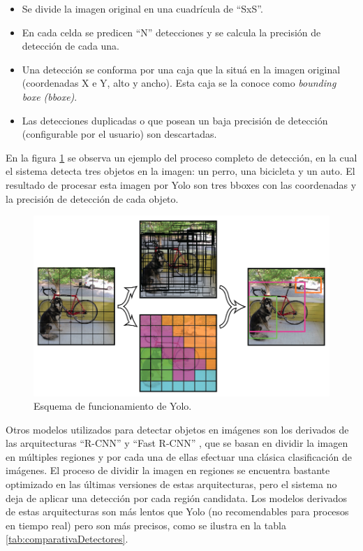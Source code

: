 \begin{itemize}
\item Se divide la imagen original en una cuadrícula de ``SxS''.
\item En cada celda se predicen ``N'' detecciones y se calcula la precisión de detección de cada una.
\item Una detección se conforma por una caja que la situá en la imagen original (coordenadas X e Y, alto y ancho). Esta caja se la conoce como \textit{bounding boxe (bboxe)}.
\item Las detecciones duplicadas o que posean un baja precisión de detección (configurable por el usuario) son descartadas.
\end{itemize}

En la figura \ref{fig:diagramaYolo} se observa un ejemplo del proceso completo de detección, en la cual el sistema detecta tres objetos en la imagen: un perro, una bicicleta y un auto. El resultado de procesar esta imagen por Yolo son tres bboxes con las coordenadas y la precisión de detección de cada objeto.

\begin{figure}[ht]
	\centering
	\includegraphics[scale=.60]{./Figures/yolo.png}
	\caption{Esquema de funcionamiento de Yolo\protect\footnotemark.}
	\label{fig:diagramaYolo}
\end{figure}


\newpage

Otros modelos utilizados para detectar objetos en imágenes son los derivados de las arquitecturas ``R-CNN'' y ``Fast R-CNN'' \citep{RCNN}, que se basan en dividir la imagen en múltiples regiones y por cada una de ellas efectuar una clásica clasificación de imágenes. El proceso de dividir la imagen en regiones se encuentra bastante optimizado en las últimas versiones de estas arquitecturas, pero el sistema no deja de aplicar una detección por cada región candidata. Los modelos derivados de estas arquitecturas son más lentos que Yolo (no recomendables para procesos en tiempo real) pero son más precisos, como se ilustra en la tabla \ref{tab:comparativaDetectores}.

